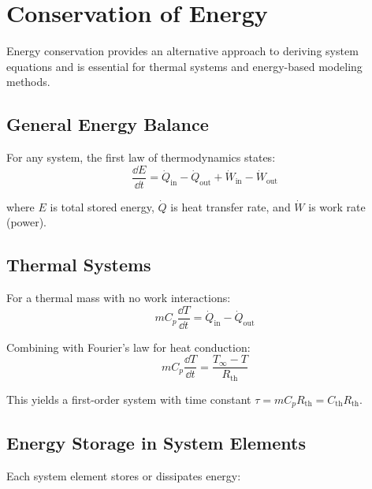 \section{Conservation of Energy}
\label{sec:energy_conservation}

Energy conservation provides an alternative approach to deriving system equations and is essential for thermal systems and energy-based modeling methods.

\subsection{General Energy Balance}

For any system, the first law of thermodynamics states:
\begin{equation}
\frac{\dd E}{\dd t} = \dot{Q}_{\text{in}} - \dot{Q}_{\text{out}} + \dot{W}_{\text{in}} - \dot{W}_{\text{out}}
\label{eq:energy_balance}
\end{equation}

where $E$ is total stored energy, $\dot{Q}$ is heat transfer rate, and $\dot{W}$ is work rate (power).

\subsection{Thermal Systems}

For a thermal mass with no work interactions:
\begin{equation}
mC_p\frac{\dd T}{\dd t} = \dot{Q}_{\text{in}} - \dot{Q}_{\text{out}}
\label{eq:thermal_energy}
\end{equation}

Combining with Fourier's law for heat conduction:
\begin{equation}
mC_p\frac{\dd T}{\dd t} = \frac{T_{\infty} - T}{R_{\text{th}}}
\label{eq:thermal_system}
\end{equation}

This yields a first-order system with time constant $\tau = mC_p R_{\text{th}} = C_{\text{th}}R_{\text{th}}$.

\subsection{Energy Storage in System Elements}

Each system element stores or dissipates energy:

